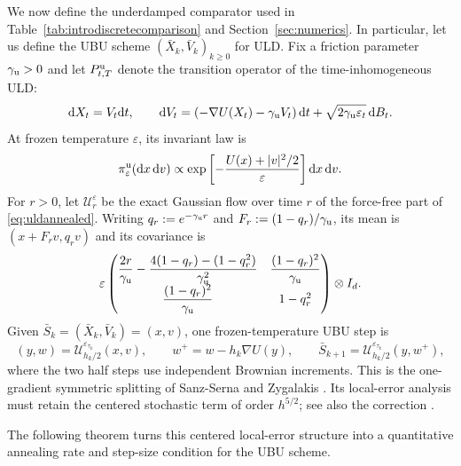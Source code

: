 \documentclass[11pt]{article}
\theoremstyle{definition}
\newcommand{\dd}{\mathrm d}
\newcommand{\Id}{I}
\newcommand{\eps}{\varepsilon}
\begin{document}
We now define the underdamped comparator used in
Table~\ref{tab:introdiscretecomparison} and Section~\ref{sec:numerics}.
In particular, let us define the UBU scheme $(\bar{X}_{k},\bar{V}_{k})_{k\geq 0}$ for ULD.
Fix a friction parameter $\gamma_{\rm u}>0$ and let
$P^{\rm u}_{t,T}$ denote the transition operator of the time-inhomogeneous ULD:
\begin{equation}\label{eq:uldannealed}
 \dd X_t=V_t\dd t,\qquad
 \dd V_t=\left(-\nabla U(X_t)-\gamma_{\rm u}V_t\right)\dd t
       +\sqrt{2\gamma_{\rm u}\eps_t}\,\dd B_t.
\end{equation}
At frozen temperature $\eps$, its invariant law is
\begin{equation}\label{eq:uldgibbs}
 \pi^{\rm u}_\eps(\dd x\,\dd v)
 \propto \exp\left[-\frac{U(x)+|v|^2/2}{\eps}\right]\dd x\,\dd v.
\end{equation}
For $r>0$, let $\mathcal U_r^\eps$ be the exact Gaussian flow over time $r$ of
the force-free part of \eqref{eq:uldannealed}. Writing
$q_r:=e^{-\gamma_{\rm u}r}$ and $F_r:=(1-q_r)/\gamma_{\rm u}$, its mean is
$(x+F_rv,q_rv)$ and its covariance is
\begin{equation}\label{eq:ubuflowcov}
 \eps\begin{pmatrix}
 \displaystyle \frac{2r}{\gamma_{\rm u}}
  -\frac{4(1-q_r)-(1-q_r^2)}{\gamma_{\rm u}^2}
 &\displaystyle \frac{(1-q_r)^2}{\gamma_{\rm u}}\\[3pt]
 \displaystyle \frac{(1-q_r)^2}{\gamma_{\rm u}}
 &1-q_r^2
 \end{pmatrix}\otimes\Id_d.
\end{equation}
Given $\bar S_k=(\bar{X}_{k},\bar{V}_{k})=(x,v)$, one frozen-temperature UBU step is
\begin{equation}\label{eq:ubustep}
 (y,w)=\mathcal U_{h_k/2}^{\eps_{\tau_k}}(x,v),\qquad
 w^+=w-h_k\nabla U(y),\qquad
 \bar S_{k+1}=\mathcal U_{h_k/2}^{\eps_{\tau_k}}\left(y,w^+\right),
\end{equation}
where the two half steps use independent Brownian increments. This is the
one-gradient symmetric splitting of Sanz-Serna and Zygalakis
\cite[Example~8]{SanzSernaZygalakis2021}. Its local-error analysis must retain
the centered stochastic term of order $h^{5/2}$; see also the correction
\cite{PaulinWhalley2024}.

The following theorem turns this centered local-error structure into a
quantitative annealing rate and step-size condition for the UBU scheme.
\end{document}
